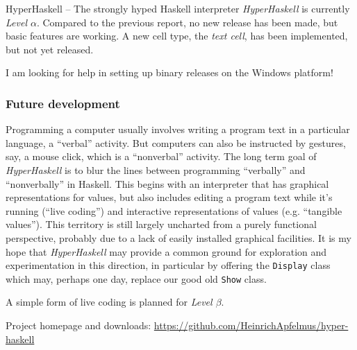 \begin{hcarentry}[updated]{HyperHaskell -- The strongly hyped Haskell interpreter}
\emph{HyperHaskell} is currently \emph{Level $\alpha$}. Compared to the previous report, no new release has been made, but basic features are working. A new cell type, the \emph{text cell}, has been implemented, but not yet released.

I am looking for help in setting up binary releases on the Windows platform!

\subsubsection*{Future development}

Programming a computer usually involves writing a program text in a particular
language, a ``verbal'' activity. But computers can also be instructed by
gestures, say, a mouse click, which is a ``nonverbal'' activity. The long term
goal of \emph{HyperHaskell} is to blur the lines between programming
``verbally'' and ``nonverbally'' in Haskell. This begins with an interpreter
that has graphical representations for values, but also includes editing a
program text while it's running (``live coding'') and interactive
representations of values (e.g. ``tangible values''). This territory is still
largely uncharted from a purely functional perspective, probably due to a lack
of easily installed graphical facilities. It is my hope that
\emph{HyperHaskell} may provide a common ground for exploration and
experimentation in this direction, in particular by offering the
\verb!Display! class which may, perhaps one day, replace our good old
\verb!Show! class.

A simple form of live coding is planned for \emph{Level $\beta$}.

\FurtherReading
\begin{compactitem}
  \item Project homepage and downloads: \url{https://github.com/HeinrichApfelmus/hyper-haskell}
\end{compactitem}
\end{hcarentry}
